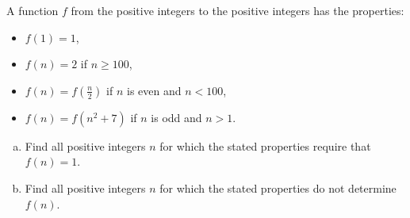 A function $f$ from the positive integers to the positive integers has the
properties:

\begin{itemize}

\item $f(1) = 1$,
\item $f(n) = 2$ if $n \ge 100$,
\item $f(n) = \displaystyle{ f \left( \frac{n}{2} \right) }$ if $n$ is even and
      $n < 100$,
\item $f(n) = f(n^2 + 7)$ if $n$ is odd and $n > 1$.

\end{itemize}

\begin{enumerate}[(a)]

\item Find all positive integers $n$ for which the stated properties require
      that $f (n) = 1$.

\item Find all positive integers $n$ for which the stated properties do not
      determine $f (n)$.

\end{enumerate}
